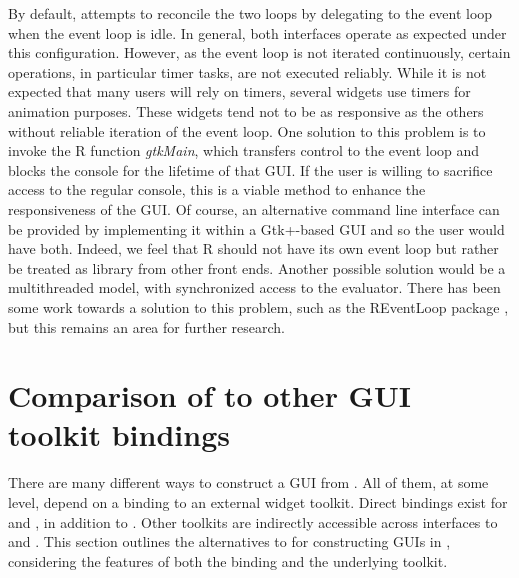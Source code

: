 \documentclass[article]{jss}
\begin{document}
By default,  attempts to reconcile the two loops by
delegating to the  event loop when the  event
loop is idle. In general, both interfaces operate as expected under
this configuration. However, as the  event loop is not
iterated continuously, certain operations, in particular timer tasks,
are not executed reliably. While it is not expected that many
 users will rely on timers, several  widgets use
timers for animation purposes. These widgets tend not to be as
responsive as the others without reliable iteration of the 
event loop. One solution to this problem is to invoke the R function
\emph{gtkMain}, which transfers control to the  event loop
and blocks the  console for the lifetime of that GUI.  If
the user is willing to sacrifice access to the regular 
console, this is a viable method to enhance the responsiveness of the
 GUI.  Of course, an alternative command line interface can
be provided by implementing it within a Gtk+-based GUI and so the user
would have both. Indeed, we feel that R should not have its own event
loop but rather be treated as library from other front ends.  Another
possible solution would be a multithreaded model, with synchronized
access to the  evaluator. There has been some work towards
a solution to this problem, such as the REventLoop package
\citep{REventLoop}, but this remains an area for further
research.

\section[Comparison of RGtk2 to other R GUI toolkit
bindings]{Comparison of  to other  GUI toolkit
bindings}\label{sec:comparison}

There are many different ways to construct a GUI from .
All of them,
at some level, depend on a binding to an external widget toolkit.
Direct bindings
exist for  \citep{ousterhout,welch} and 
\citep{wxwidgets}, 
in addition to . Other toolkits are indirectly accessible
across 
interfaces to  \citep{DCOM} and 
\citep{Java}. 
This section outlines the alternatives to  for
constructing GUIs in , considering the features of both
the
 binding and the underlying toolkit.
\end{document}
